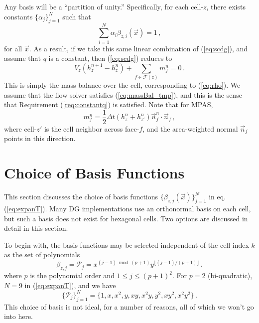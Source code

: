 \documentclass[11pt]{report}
\newcommand{\half}[0]{\frac{1}{2}}
\newcommand{\svec}[1]{{\Vec{#1}}}
\begin{document}
Any basis will be a ``partition of unity.''  Specifically, for each
cell-$z$, there exists constants $\{\alpha_{j}\}_{j=1}^N$ such that
\begin{equation}
  \sum_{i=1}^N \alpha_{i} \beta_{z,i}(\svec{x}) = 1\,,
\end{equation}
for all $\svec{x}$.
As a result, if we take this same linear combination of (\ref{eq:scdg}), and
assume that $q$ is a constant, then (\ref{eq:scdg}) reduces to
\begin{equation}
  \label{eq:massBal_tmp}
  V_z (h_z^{n+1} - h_z^{n}) +
  \sum_{f\in\mathcal{F}(z)} m_f^n = 0\,.
\end{equation}
This is simply the mass balance over the cell, corresponding to
(\ref{eq:rho}).  We assume that the flow solver satisfies
(\ref{eq:massBal_tmp}), and this is the sense that Requirement
(\ref{req:constantq}) is satisfied.
Note that for MPAS,
\begin{equation}
  m_f^n = \half \Delta t (h_z^n + h_{z'}^n) \svec{u}_f^n \cdot \svec{n}_f\,,
\end{equation}
where cell-$z'$ is the cell neighbor across face-$f$, and the area-weighted
normal $\svec{n}_f$ points in this direction.

\section{Choice of Basis Functions}
\label{sec:basis}

This section discusses the choice of basis functions
$\{\beta_{z,j}(\svec{x})\}_{j=1}^N$ in eq. (\ref{eq:expanT}).  Many DG
implementations use an orthonormal basis on each cell, but such a basis does
not exist for hexagonal cells.  Two options are discussed in detail in this
section.

To begin with,
the basis functions may be selected independent of the cell-index $k$ as the
set of polynomials
\begin{equation}
  \label{eq:basis_quad_raw}
  \beta_{z,j} = \mathcal{P}_j = x^{(j-1)\bmod (p+1)} 
      y^{\lfloor (j-1)/(p+1) \rfloor}\,.
\end{equation}
where $p$ is the polynomial order and $1 \le j \le (p+1)^2$.
For $p=2$ (bi-quadratic), $N = 9$ in (\ref{eq:expanT}), and we have
\begin{equation}
  \label{eq:biquadradic}
  \{\mathcal{P}_j\}_{j=1}^N = \{1,x,x^2,y,xy,x^2y,y^2,xy^2,x^2y^2\}\,.
\end{equation}
This choice of basis is not ideal, for a number of reasons, all of which we
won't go into here.
\end{document}
